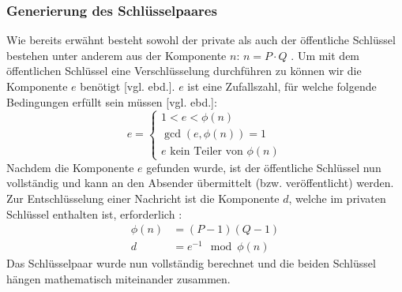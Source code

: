 \documentclass[a4paper,ngerman, headheight=28pt,12pt]{scrartcl}
\newcommand{\vcite}[1]{\cite[vgl.][]{#1}}
\newcommand{\vebd}{[vgl. ebd.]}
\begin{document}
\subsubsection{Generierung des Schlüsselpaares}
Wie bereits erwähnt besteht sowohl der private als auch der öffentliche Schlüssel bestehen unter anderem aus der Komponente  $n$: $n = P \cdot Q$ \vcite{RsaMaths1}. Um mit dem öffentlichen Schlüssel eine Verschlüsselung durchführen zu können wir die Komponente $e$ benötigt \vebd. $e$ ist eine Zufallszahl, für welche folgende Bedingungen erfüllt sein müssen \vebd:
\begin{equation*}
  e = \begin{cases}
    1 < e < \phi(n)      \\
    \gcd(e, \phi(n)) = 1 \\
    \text{$e$ kein Teiler von $\phi(n)$}
  \end{cases}
\end{equation*}
Nachdem die Komponente $e$ gefunden wurde, ist der öffentliche Schlüssel nun vollständig und kann an den Absender übermittelt (bzw. veröffentlicht) werden. Zur Entschlüsselung einer Nachricht ist die Komponente $d$, welche im privaten Schlüssel enthalten ist, erforderlich \vcite{RsaMaths1}:
\begin{equation*}
  \begin{aligned}
    \phi(n) & = (P-1)(Q-1)          \\
    d       & = e^{-1} \mod \phi(n)
  \end{aligned}
\end{equation*}
Das Schlüsselpaar wurde nun vollständig berechnet und die beiden Schlüssel hängen mathematisch miteinander zusammen.
\end{document}
